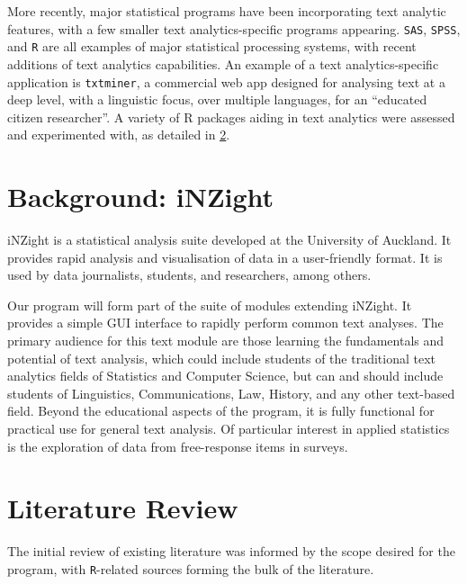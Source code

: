 \documentclass[11pt, a4paper, titlepage]{report}
\begin{document}
More recently, major statistical programs have been incorporating text
analytic features, with a few smaller text analytics-specific programs
appearing. \texttt{SAS}\autocite{inc.19:_sas_text_miner},
\texttt{SPSS}\autocite{corp.17:_ibm_spss_statis_window_version}, and
\texttt{R}\autocite{team19:_r} are all examples of major statistical processing
systems, with recent additions of text analytics capabilities. An
example of a text analytics-specific application is \texttt{txtminer}, a
commercial web app designed for analysing text at a deep level, with a
linguistic focus, over multiple languages, for an ``educated citizen
researcher''\autocite{bnosac19:_autom_text_analy}. A variety of R
packages aiding in text analytics were assessed and experimented with,
as detailed in \underline{\cref{sec:liter-revi-exist}}.

\section{Background: iNZight}\label{sec:background:-inzight}

iNZight is a statistical analysis suite developed at the University of
Auckland\autocite{wild:_data_analy}. It provides rapid analysis and
visualisation of data in a user-friendly format. It is used by data
journalists, students, and researchers, among others.

Our program will form part of the suite of modules extending iNZight.
It provides a simple GUI interface to rapidly perform common text
analyses. The primary audience for this text module are those learning
the fundamentals and potential of text analysis, which could include
students of the traditional text analytics fields of Statistics and
Computer Science, but can and should include students of Linguistics,
Communications, Law, History, and any other text-based field. Beyond
the educational aspects of the program, it is fully functional for
practical use for general text analysis. Of particular interest in
applied statistics is the exploration of data from free-response items
in surveys.

\section{Literature Review}\label{sec:liter-revi-exist}

The initial review of existing literature was informed by the scope
desired for the program, with \texttt{R}-related sources forming the bulk of
the literature.
\end{document}
